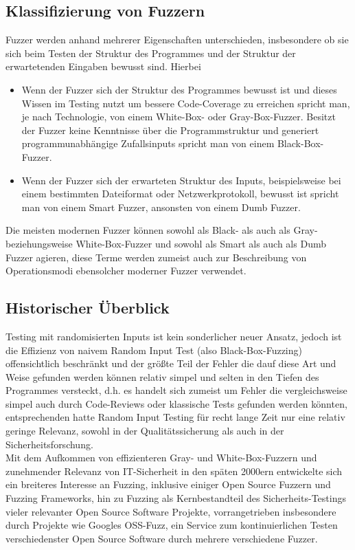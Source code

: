 \documentclass[12pt]{scrartcl}
\begin{document}
\subsection{Klassifizierung von Fuzzern}
Fuzzer werden anhand mehrerer Eigenschaften unterschieden, insbesondere ob sie sich beim Testen der Struktur des Programmes und der Struktur der erwartetenden Eingaben bewusst sind. Hierbei
\begin{itemize}
    \item Wenn der Fuzzer sich der Struktur des Programmes bewusst ist und dieses Wissen im Testing nutzt um bessere Code-Coverage zu erreichen spricht man, je nach Technologie, von einem White-Box- oder Gray-Box-Fuzzer. Besitzt der Fuzzer keine Kenntnisse über die Programmstruktur und generiert programmunabhängige Zufallsinputs spricht man von einem Black-Box-Fuzzer.
    \item Wenn der Fuzzer sich der erwarteten Struktur des Inputs, beispielsweise bei einem bestimmten Dateiformat oder Netzwerkprotokoll, bewusst ist spricht man von einem Smart Fuzzer, ansonsten von einem Dumb Fuzzer.
\end{itemize}
Die meisten modernen Fuzzer können sowohl als Black- als auch als Gray- beziehungsweise White-Box-Fuzzer und sowohl als Smart als auch als Dumb Fuzzer agieren, diese Terme werden zumeist auch zur Beschreibung von Operationsmodi ebensolcher moderner Fuzzer verwendet.

\subsection{Historischer Überblick}
Testing mit randomisierten Inputs ist kein sonderlicher neuer Ansatz, jedoch ist die Effizienz von naivem Random Input Test (also Black-Box-Fuzzing) offensichtlich beschränkt und der größte Teil der Fehler die dauf diese Art und Weise gefunden werden können relativ simpel und selten in den Tiefen des Programmes versteckt, d.h. es handelt sich zumeist um Fehler die vergleichsweise simpel auch durch Code-Reviews oder klassische Tests gefunden werden könnten, entsprechenden hatte Random Input Testing für recht lange Zeit nur eine relativ geringe Relevanz, sowohl in der Qualitätssicherung als auch in der Sicherheitsforschung.\\
Mit dem Aufkommen von effizienteren Gray- und White-Box-Fuzzern und zunehmender Relevanz von IT-Sicherheit in den späten 2000ern entwickelte sich ein breiteres Interesse an Fuzzing, inklusive einiger Open Source Fuzzern und Fuzzing Frameworks, hin zu Fuzzing als Kernbestandteil des Sicherheits-Testings vieler relevanter Open Source Software Projekte, vorrangetrieben insbesondere durch Projekte wie Googles OSS-Fuzz, ein Service zum kontinuierlichen Testen verschiedenster Open Source Software durch mehrere verschiedene Fuzzer.
\end{document}
